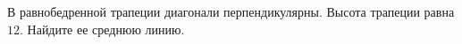 \begin{ex}
	\begin{condition}
		В равнобедренной трапеции диагонали перпендикулярны. Высота трапеции равна \( 12 \). Найдите ее среднюю линию.
	\end{condition}
\end{ex}